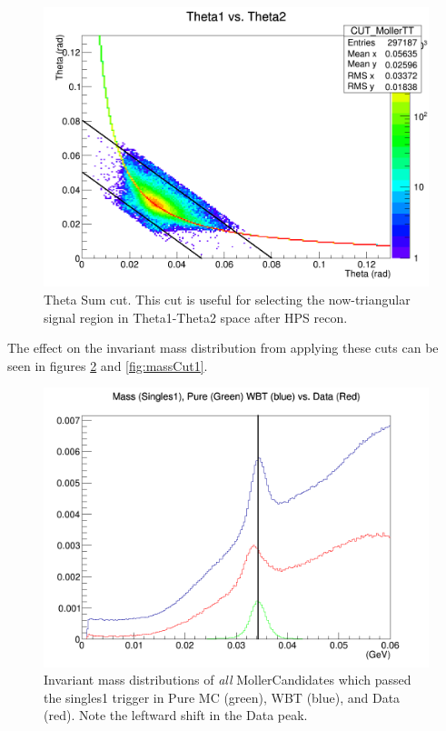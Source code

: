 \documentclass{article}
\begin{document}
\begin{figure}[H]
  	\includegraphics[width=\linewidth]{MollerPlots/CUT_PlotTT_cut}
  	\caption{Theta Sum cut. This cut is useful for selecting the now-triangular signal region in Theta1-Theta2 space after HPS recon.}
  	\label{fig:TSumCutPlot}
	\end{figure}

The effect on the invariant mass distribution from applying these cuts can be seen in figures \ref{fig:massUncut1} and \ref{fig:massCut1}.

\begin{figure}[H]
  	\includegraphics[width=\linewidth]{MollerPlots/ALL_massSingles1_shift}
  	\caption{Invariant mass distributions of \textit{all} MollerCandidates which passed the singles1 trigger in Pure MC (green), WBT (blue), and Data (red). Note the leftward shift in the Data peak.}
  	\label{fig:massUncut1}
	\end{figure}
\end{document}
